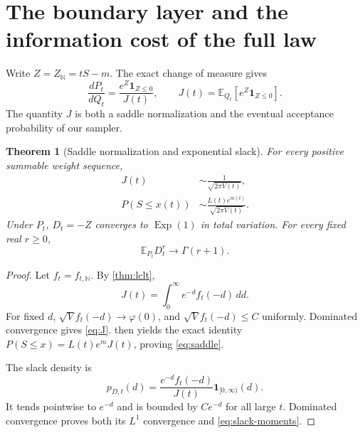 \documentclass[11pt,a4paper]{article}
\numberwithin{equation}{section}
\newtheorem{theorem}{Theorem}[section]
\theoremstyle{definition}
\theoremstyle{remark}
\newcommand{\N}{\mathbb N}
\newcommand{\E}{\mathbb E}
\newcommand{\Qt}{Q_t}
\newcommand{\Pt}{P_t}
\newcommand{\Exp}{\operatorname{Exp}}
\newcommand{\ind}{\mathbf 1}
\newcommand{\phiN}{\varphi}
\begin{document}
\section{The boundary layer and the information cost of the full law}
\label{sec:slack}
Write $Z=Z_{\N}=tS-m$. The exact change of measure gives
\begin{equation}\label{eq:RN-full}
 \frac{d\Pt}{d\Qt}=\frac{e^Z\ind_{Z\le0}}{J(t)},\qquad
 J(t)=\E_{\Qt}[e^Z\ind_{Z\le0}].
\end{equation}
The quantity $J$ is both a saddle normalization and the eventual
acceptance probability of our sampler.

\begin{theorem}[Saddle normalization and exponential slack]
\label{thm:slack}
For every positive summable weight sequence,
\begin{align}
 J(t)&\sim\frac1{\sqrt{2\pi V(t)}},\label{eq:J}\\
 P(S\le x(t))&\sim\frac{L(t)e^{m(t)}}{\sqrt{2\pi V(t)}}.\label{eq:saddle}
\end{align}
Under $\Pt$, $D_t=-Z$ converges to $\Exp(1)$ in total variation.
For every fixed real $r\ge0$,
\begin{equation}\label{eq:slack-moments}
 \E_{\Pt}D_t^r\longrightarrow\Gamma(r+1).
\end{equation}
\end{theorem}
\begin{proof}
Let $f_t=f_{t,\N}$. By \cref{thm:lclt},
\begin{equation}\label{eq:J-integral}
 J(t)=\int_0^\infty e^{-d}f_t(-d)\,dd.
\end{equation}
For fixed $d$, $\sqrt V f_t(-d)\to\phiN(0)$, and
$\sqrt V f_t(-d)\le C$ uniformly. Dominated convergence gives
\cref{eq:J}.  then yields the exact
identity $P(S\le x)=L(t)e^mJ(t)$, proving \cref{eq:saddle}.

The slack density is
\begin{equation}\label{eq:slack-density}
 p_{D,t}(d)=\frac{e^{-d}f_t(-d)}{J(t)}\ind_{[0,\infty)}(d).
\end{equation}
It tends pointwise to $e^{-d}$ and is bounded by $Ce^{-d}$ for all
large $t$. Dominated convergence proves both its $L^1$ convergence
and \cref{eq:slack-moments}.
\end{proof}
\end{document}
